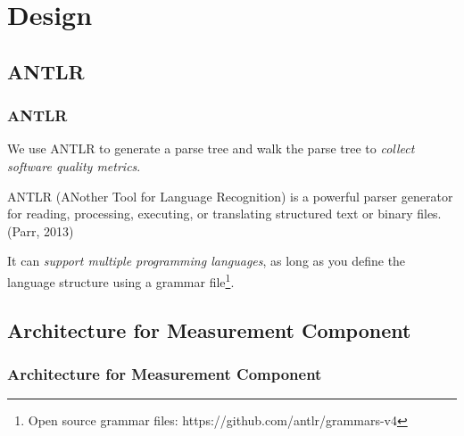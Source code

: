 \section{Design}

\subsection{ANTLR}
\begin{frame}
\frametitle{ANTLR}

We use ANTLR to generate a parse tree and walk the parse tree to \emph{collect software quality metrics}.

\begin{definition}
ANTLR (ANother Tool for Language Recognition) is a powerful parser generator for reading, processing, executing, or translating structured text or binary files. (Parr, 2013)
\end{definition}

It can \emph{support multiple programming languages}, as long as you define the language structure using a grammar file\footnote{Open source grammar files: https://github.com/antlr/grammars-v4}.

\end{frame}

\subsection{Architecture for Measurement Component}
\begin{frame}
\frametitle{Architecture for Measurement Component}


\end{frame}
